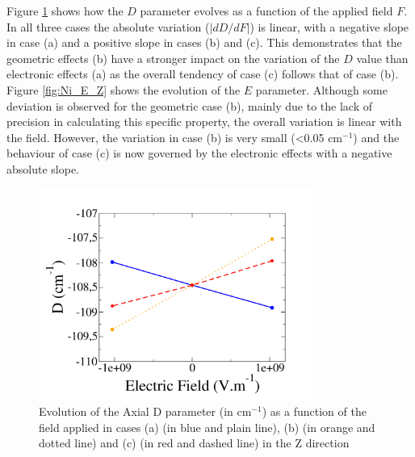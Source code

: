 \documentclass[12pt]{report}
\numberwithin{equation}{section}
\begin{document}

Figure \ref{fig:Ni_D_Z} shows how the $D$ parameter evolves as a function of the applied field $F$.
In all three cases the absolute variation ($|dD/dF|$) is linear, with a negative slope in case (a) and a positive slope in cases (b) and (c).
This demonstrates that the geometric effects (b) have a stronger impact on the variation of the $D$ value than electronic effects (a) as the overall tendency of case (c) follows that of case (b).
Figure \ref{fig:Ni_E_Z} shows the evolution of the $E$ parameter.
Although some deviation is observed for the geometric case (b), mainly due to the lack of precision in calculating this specific property, the overall variation is linear with the field.
However, the variation in case (b) is very small (<0.05 cm$^{-1}$) and the behaviour of case (c) is now governed by the electronic effects with a negative absolute slope.

\begin{figure}[!ht]
    \centering
    \includegraphics[width=0.8\textwidth]{Images/D_E_Z.png}
    \caption{Evolution of the Axial D parameter (in cm$^{-1}$) as a function of the field applied in cases (a) (in blue and plain line), (b) (in orange and dotted line) and (c) (in red and dashed line) in the Z direction}
    \label{fig:Ni_D_Z}
\end{figure}
\end{document}

